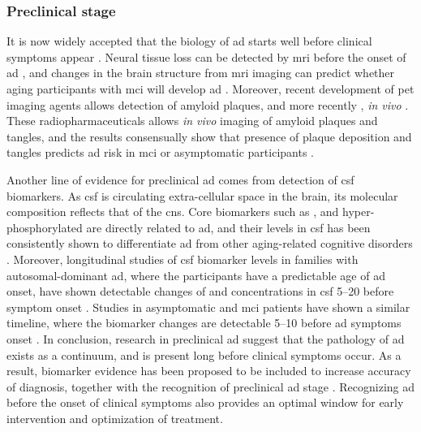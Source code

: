\subsubsection{Preclinical stage}

It is now widely accepted that the biology of \gls{ad} starts well before clinical symptoms appear \citep{dubois16}. Neural tissue loss can be detected by \gls{mri} before the onset of \gls{ad} \citep{jack92, scheltens92, chetelat03}, and changes in the brain structure from \gls{mri} imaging can predict whether aging participants with \gls{mci} will develop \gls{ad} \citep{jack99}. Moreover, recent development of \gls{pet} imaging agents allows detection of amyloid plaques, and more recently \atau{}, \textit{in vivo} \citep{mathis03, maruyama13, okamura13}. These radiopharmaceuticals allows \textit{in vivo} imaging of amyloid plaques and \atau{} tangles, and the results consensually show that presence of plaque deposition and \atau{} tangles predicts \gls{ad} risk in \gls{mci} or asymptomatic participants \citep{klunk04, chien14, sepulcre16}.

Another line of evidence for preclinical \gls{ad} comes from detection of \gls{csf} biomarkers. As \gls{csf} is circulating extra-cellular space in the brain, its molecular composition reflects that of the \gls{cns}. Core biomarkers such as \abeta{}, \atau{} and hyper-phosphorylated \atau{} are directly related to \gls{ad}, and their levels in \gls{csf} has been consistently shown to differentiate \gls{ad} from other aging-related cognitive disorders \citep{blennow10}. Moreover, longitudinal studies of \gls{csf} biomarker levels in families with autosomal-dominant \gls{ad}, where the participants have a predictable age of \gls{ad} onset, have shown detectable changes of \abeta{} and \atau{} concentrations in \gls{csf} \SIrange{5}{20}{\year} before symptom onset \citep{bateman12, fagan14}. Studies in asymptomatic and \gls{mci} patients have shown a similar timeline, where the biomarker changes are detectable \SIrange{5}{10}{\year} before \gls{ad} symptoms onset \citep{buchhave12, vos13}. 
In conclusion, research in preclinical \gls{ad} suggest that the pathology of \gls{ad} exists as a continuum, and is present long before clinical symptoms occur. As a result, biomarker evidence has been proposed to be included to increase accuracy of diagnosis, together with the recognition of preclinical \gls{ad} stage \citep{ad16}. Recognizing \gls{ad} before the onset of clinical symptoms also provides an optimal window for early intervention and optimization of treatment. 

